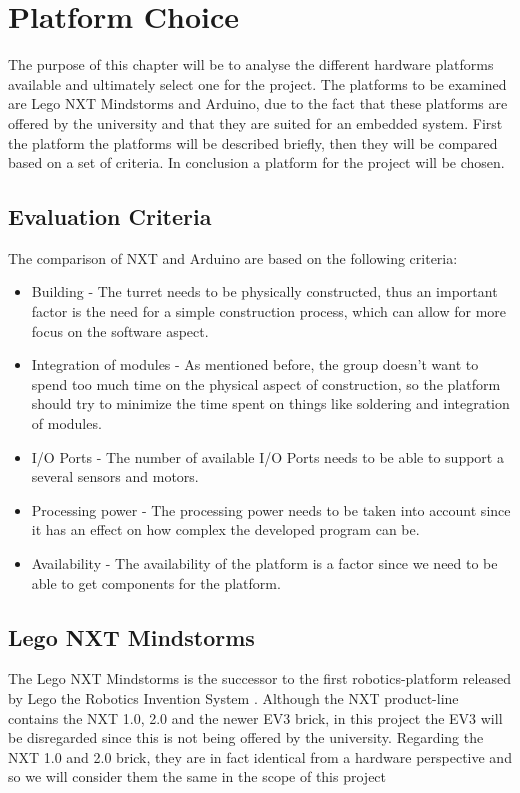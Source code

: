 \chapter{Platform Choice}\label{PlatformC}
The purpose of this chapter will be to analyse the different hardware platforms available
and ultimately select one for the project. The platforms to be examined are Lego
NXT Mindstorms and Arduino, due to the fact that these platforms are offered by
the university and that they are suited for an embedded system.
First the platform the platforms will be described briefly, then they will be
compared based on a set of criteria. In conclusion a platform for the project
will be chosen.

\section{Evaluation Criteria}
The comparison of NXT and Arduino are based on the following criteria:

\begin{itemize}
  \item Building - The turret needs to be physically constructed, thus an
  important factor is the need for a simple construction process, which can
  allow for more focus on the software aspect.
  \item Integration of modules - As mentioned before, the group doesn't want to spend too
  much time on the physical aspect of construction, so the platform should try to minimize
  the time spent on things like soldering and integration of modules.
  \item I/O Ports - The number of available I/O Ports needs to be able to
  support a several sensors and motors.
  \item Processing power - The processing power needs to be taken into account
  since it has an effect on how complex the developed program can be.
  \item Availability - The availability of the platform is a factor since we
  need to be able to get components for the platform.
\end{itemize}

\section{Lego NXT Mindstorms}
The Lego NXT Mindstorms is the successor to the first robotics-platform released
by Lego the Robotics Invention System \citep{NXTHistory}. Although the NXT
product-line contains the NXT 1.0, 2.0 and the newer EV3 brick, in this project
the EV3 will be disregarded since this is not being offered by the university.
Regarding the NXT 1.0 and 2.0 brick, they are in fact identical from a hardware
perspective and so we will consider them the same in the scope of this project
\citep{NXTversions}\nl

